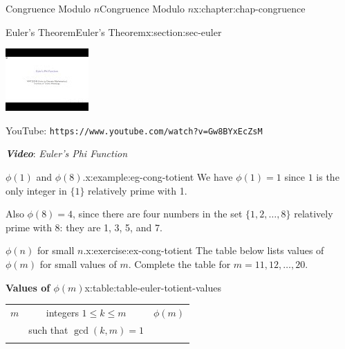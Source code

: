\documentclass[oneside,10pt,]{book}
\newcommand{\tabularfont}{\relax}
\newcommand{\mono}[1]{\texttt{#1}}
\newcommand{\alert}[1]{\textbf{\textit{#1}}}
\numberwithin{equation}{section}
\newcommand{\hrulemedium}{\noalign{\hrule height 0.07em}}
\newlength{\qrsize}
\newlength{\previewwidth}
\begin{document}
\begin{chapterptx}{Congruence Modulo \(n\)}{}{Congruence Modulo \(n\)}{}{}{x:chapter:chap-congruence}
\begin{sectionptx}{Euler's Theorem}{}{Euler's Theorem}{}{}{x:section:sec-euler}
\begin{sidebyside}{1}{0}{0}{0}
\begin{sbspanel}{1}
\begin{tcbraster}[raster columns=2, raster column skip=1pt, raster halign=center, raster force size=false, raster left skip=0pt, raster right skip=0pt]
\begin{tcolorbox}[previewstyle, width=\previewwidth]
\includegraphics[width=0.80\linewidth,height=\qrsize,keepaspectratio]{images/video-euler-phi-function.jpg}%
\end{tcolorbox}%
\begin{tcolorbox}[qrstyle]%
{\hypersetup{urlcolor=black}}%
\end{tcolorbox}%
\begin{tcolorbox}[captionstyle]%
\small YouTube: \mono{https://www.youtube.com/watch?v=Gw8BYxEcZsM}\end{tcolorbox}%
\end{tcbraster}%
\end{sbspanel}%
\end{sidebyside}%
\par
\alert{Video}: \emph{Euler's Phi Function}%
\begin{example}{\(\phi(1)\) and \(\phi(8)\).}{x:example:eg-cong-totient}%
We have \(\phi(1) = 1\) since \(1\) is the only integer in \(\{1\}\) relatively prime with 1.%
\par
Also \(\phi(8) = 4\), since there are four numbers in the set \(\{1,2,\ldots,8\}\) relatively prime with 8: they are 1, 3, 5, and 7.%
\end{example}
\begin{inlineexercise}{\(\phi(n)\) for small \(n\).}{x:exercise:ex-cong-totient}%
The table below lists values of \(\phi(m)\) for small values of \(m\). Complete the table for \(m = 11, 12, \ldots, 20\).%
\begin{tableptx}{\textbf{Values of \(\phi(m)\)}}{x:table:table-euler-totient-values}{}%
\centering%
{\tabularfont%
\begin{tabular}{ccc}
\(m\)&integers \(1 \leq k \leq m\)&\(\phi(m)\)\tabularnewline[0pt]
&such that \(\gcd(k,m)=1\)&\tabularnewline\hrulemedium

\end{tabular}}
\end{tableptx}
\end{inlineexercise}
\end{sectionptx}
\end{chapterptx}
\end{document}
